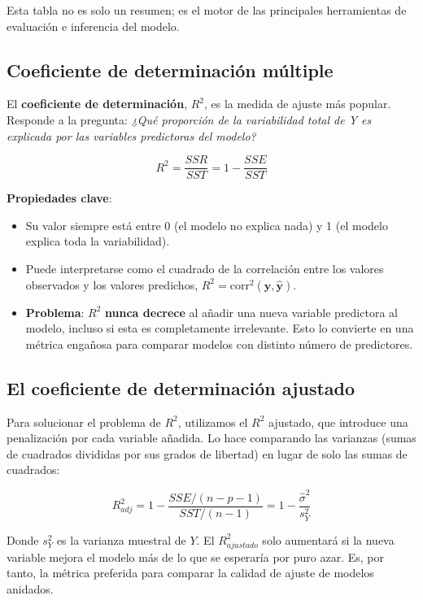 \documentclass[
  letterpaper,
  DIV=11,
  numbers=noendperiod]{scrreprt}
\providecommand{\tightlist}{%
  \setlength{\itemsep}{0pt}\setlength{\parskip}{0pt}}
\begin{document}
Esta tabla no es solo un resumen; es el motor de las principales
herramientas de evaluación e inferencia del modelo.

\subsection{Coeficiente de determinación
múltiple}\label{coeficiente-de-determinaciuxf3n-muxfaltiple}

El \textbf{coeficiente de determinación}, \(R^2\), es la medida de
ajuste más popular. Responde a la pregunta: \emph{¿Qué proporción de la
variabilidad total de Y es explicada por las variables predictoras del
modelo?}

\[R^2 = \frac{SSR}{SST} = 1 - \frac{SSE}{SST}\]

\textbf{Propiedades clave}:

\begin{itemize}
\tightlist
\item
  Su valor siempre está entre 0 (el modelo no explica nada) y 1 (el
  modelo explica toda la variabilidad).
\item
  Puede interpretarse como el cuadrado de la correlación entre los
  valores observados y los valores predichos,
  \(R^2 = \text{corr}^2(\mathbf{y}, \hat{\mathbf{y}})\).
\item
  \textbf{Problema}: \(R^2\) \textbf{nunca decrece} al añadir una nueva
  variable predictora al modelo, incluso si esta es completamente
  irrelevante. Esto lo convierte en una métrica engañosa para comparar
  modelos con distinto número de predictores.
\end{itemize}

\subsection{El coeficiente de determinación
ajustado}\label{el-coeficiente-de-determinaciuxf3n-ajustado}

Para solucionar el problema de \(R^2\), utilizamos el \(R^2\) ajustado,
que introduce una penalización por cada variable añadida. Lo hace
comparando las varianzas (sumas de cuadrados divididas por sus grados de
libertad) en lugar de solo las sumas de cuadrados:

\[R^2_{adj} = 1 - \frac{SSE/(n-p-1)}{SST/(n-1)} = 1 - \frac{\hat{\sigma}^2}{s_Y^2}\]

Donde \(s_Y^2\) es la varianza muestral de \(Y\). El \(R^2_{ajustado}\)
solo aumentará si la nueva variable mejora el modelo más de lo que se
esperaría por puro azar. Es, por tanto, la métrica preferida para
comparar la calidad de ajuste de modelos anidados.
\end{document}
